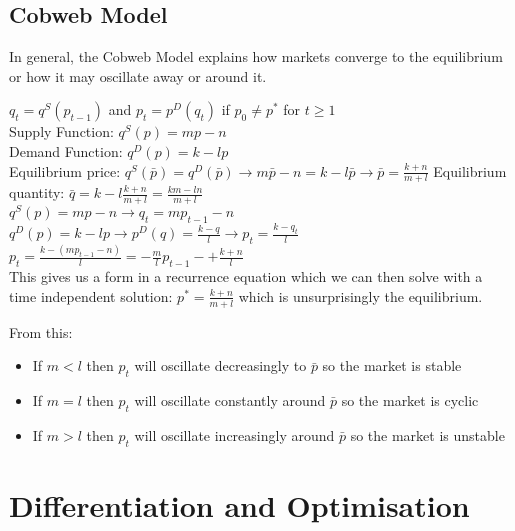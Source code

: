 \documentclass[12pt, letterpaper]{article}
\begin{document}
\subsection{Cobweb Model}
In general, the Cobweb Model explains how markets converge to the equilibrium or how it may oscillate away or around it.
\begin{center}
	$q_t=q^S(p_{t-1})$ and $p_t=p^D(q_t)$ if $p_0 \neq p^*$ for $t \geq 1$\\
	Supply Function: $q^S(p) = mp-n$\\
	Demand Function: $q^D(p) = k-lp$\\
	Equilibrium price: $q^S(\bar{p}) = q^D(\bar{p}) \rightarrow m\bar{p} -n = k - l\bar{p} \rightarrow \bar{p} = \frac{k+n}{m+l}$
	Equilibrium quantity: $\bar{q} = k - l\frac{k+n}{m+l} = \frac{km-ln}{m+l}$\\
	$q^S(p) = mp-n \rightarrow q_t = mp_{t-1} - n$\\
	$q^D(p) = k-lp \rightarrow p^D(q)=\frac{k-q}{l} \rightarrow p_t = \frac{k-q_t}{l}$\\
	$p_t = \frac{k-(mp_{t-1}-n)}{l} = -\frac{m}{l}p_{t-1}-+\frac{k+n}{l}$\\
	This gives us a form in a recurrence equation which we can then solve with a time independent solution: $p^* = \frac{k+n}{m+l}$ which is unsurprisingly the equilibrium.
\end{center}
From this:
\begin{itemize}
	\item If $m < l$ then $p_t$ will oscillate decreasingly to $\bar{p}$ so the market is stable
	\item If $m = l$ then $p_t$ will oscillate constantly around $\bar{p}$ so the market is cyclic
	\item If $m > l$ then $p_t$ will oscillate increasingly around $\bar{p}$ so the market is unstable
\end{itemize}

\newpage
\section{Differentiation and Optimisation}
\end{document}
